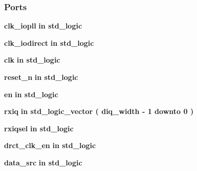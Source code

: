 \subsubsection*{Ports}
 \begin{DoxyCompactItemize}
\item 
{\bf clk\+\_\+iopll}  {\bfseries {\bfseries \textcolor{keywordflow}{in}\textcolor{vhdlchar}{ }}} {\bfseries \textcolor{comment}{std\+\_\+logic}\textcolor{vhdlchar}{ }} 
\item 
{\bf clk\+\_\+iodirect}  {\bfseries {\bfseries \textcolor{keywordflow}{in}\textcolor{vhdlchar}{ }}} {\bfseries \textcolor{comment}{std\+\_\+logic}\textcolor{vhdlchar}{ }} 
\item 
{\bf clk}  {\bfseries {\bfseries \textcolor{keywordflow}{in}\textcolor{vhdlchar}{ }}} {\bfseries \textcolor{comment}{std\+\_\+logic}\textcolor{vhdlchar}{ }} 
\item 
{\bf reset\+\_\+n}  {\bfseries {\bfseries \textcolor{keywordflow}{in}\textcolor{vhdlchar}{ }}} {\bfseries \textcolor{comment}{std\+\_\+logic}\textcolor{vhdlchar}{ }} 
\item 
{\bf en}  {\bfseries {\bfseries \textcolor{keywordflow}{in}\textcolor{vhdlchar}{ }}} {\bfseries \textcolor{comment}{std\+\_\+logic}\textcolor{vhdlchar}{ }} 
\item 
{\bf rxiq}  {\bfseries {\bfseries \textcolor{keywordflow}{in}\textcolor{vhdlchar}{ }}} {\bfseries \textcolor{comment}{std\+\_\+logic\+\_\+vector}\textcolor{vhdlchar}{ }\textcolor{vhdlchar}{(}\textcolor{vhdlchar}{ }\textcolor{vhdlchar}{ }\textcolor{vhdlchar}{ }\textcolor{vhdlchar}{ }{\bfseries {\bf diq\+\_\+width}} \textcolor{vhdlchar}{-\/}\textcolor{vhdlchar}{ } \textcolor{vhdldigit}{1} \textcolor{vhdlchar}{ }\textcolor{keywordflow}{downto}\textcolor{vhdlchar}{ }\textcolor{vhdlchar}{ } \textcolor{vhdldigit}{0} \textcolor{vhdlchar}{ }\textcolor{vhdlchar}{)}\textcolor{vhdlchar}{ }} 
\item 
{\bf rxiqsel}  {\bfseries {\bfseries \textcolor{keywordflow}{in}\textcolor{vhdlchar}{ }}} {\bfseries \textcolor{comment}{std\+\_\+logic}\textcolor{vhdlchar}{ }} 
\item 
{\bf drct\+\_\+clk\+\_\+en}  {\bfseries {\bfseries \textcolor{keywordflow}{in}\textcolor{vhdlchar}{ }}} {\bfseries \textcolor{comment}{std\+\_\+logic}\textcolor{vhdlchar}{ }} 
\item 
{\bf data\+\_\+src}  {\bfseries {\bfseries \textcolor{keywordflow}{in}\textcolor{vhdlchar}{ }}} {\bfseries \textcolor{comment}{std\+\_\+logic}\textcolor{vhdlchar}{ }} 
\item 

\end{DoxyCompactItemize}
